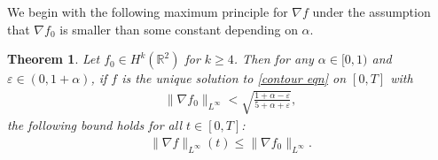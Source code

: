 \documentclass[reqno]{amsart}%
\newtheorem{thm}{Theorem}[section]
\theoremstyle{definition}
\theoremstyle{remark}
\numberwithin{equation}{section}
\newcommand{\0}{\mathbf{0}}
\newcommand{\1}{\mathbf{1}}
\newcommand{\R}{\mathbb R}
\numberwithin{equation}{section}
\numberwithin{theorem}{section}
\numberwithin{figure}{section}
\begin{document}
We begin with the following maximum principle for $\nabla f$ under the assumption that $\nabla f_0$ is smaller than some constant depending on $\alpha$.

\begin{thm}\label{max principle nabla f thm}
Let $f_0\in H^k(\R^2)$ for $k\ge4$. Then for any $\alpha\in[0,1)$ and $\varepsilon\in(0,1+\alpha)$, if $f$ is the unique solution to \eqref{contour eqn} on $[0,T]$ with 
\begin{align}\label{boundedness assumption on nabla f0}
\|\nabla f_0\|_{L^\infty}<\sqrt{\frac{1+\alpha-\varepsilon}{5+\alpha+\varepsilon}},
\end{align}
the following bound holds for all $t\in[0,T]$:
\begin{align}\label{max principle for nabla f}
\|\nabla f\|_{L^\infty}(t)\le\|\nabla f_0\|_{L^\infty}.
\end{align}
\end{thm}
\end{document}
